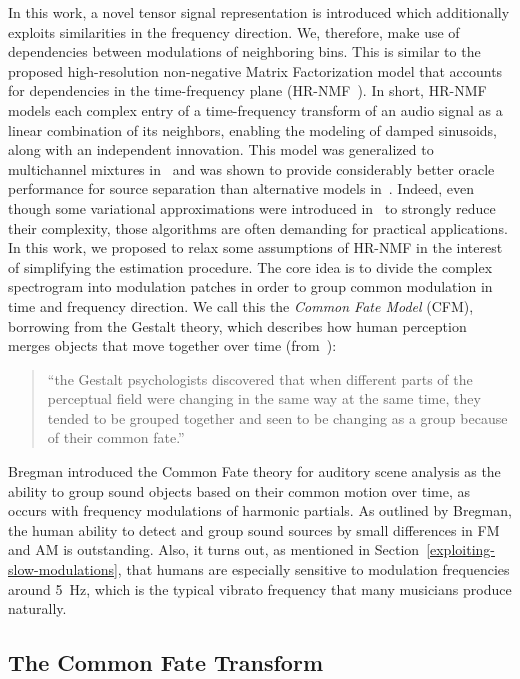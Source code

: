 In this work, a novel tensor signal representation is introduced which additionally exploits similarities in the frequency direction.
We, therefore, make use of dependencies between modulations of neighboring bins.
This is similar to the proposed high-resolution non-negative Matrix Factorization model that accounts for dependencies in the time-frequency plane (HR-NMF~\cite{badeau11}).
In short, HR-NMF models each complex entry of a time-frequency transform of an audio signal as a linear combination of its neighbors, enabling the modeling of damped sinusoids, along with an independent innovation.
This model was generalized to multichannel mixtures in~\cite{badeau13a, badeau14} and was shown to provide considerably better oracle performance for source separation than alternative models in~\cite{magron15a}.
Indeed, even though some variational approximations were introduced in~\cite{badeau13} to strongly reduce their complexity, those algorithms are often demanding for practical applications.
In this work, we proposed to relax some assumptions of HR-NMF in the interest of simplifying the estimation procedure.
The core idea is to divide the complex spectrogram into modulation patches in order to group common modulation in time and frequency direction.
We call this the \emph{Common Fate Model} (CFM), borrowing from the Gestalt theory, which describes how human perception merges objects that move together over time (from~\cite{bregman90}):

\begin{quote}
``the Gestalt psychologists discovered that when different parts of the perceptual field were changing in the same way at the same time, they tended to be grouped together and seen to be changing as a group because of their common fate.'' 
\end{quote}

Bregman introduced the Common Fate theory for auditory scene analysis as the ability to group sound objects based on their common motion over time, as occurs with frequency modulations of harmonic partials.
As outlined by Bregman, the human ability to detect and group sound sources by small differences in FM and AM is outstanding.
Also, it turns out, as mentioned in Section~\ref{exploiting-slow-modulations}, that humans are especially sensitive to modulation frequencies around 5~Hz, which is the typical vibrato frequency that many musicians produce naturally.

\subsection{The Common Fate Transform}
\label{sub:CFT}


